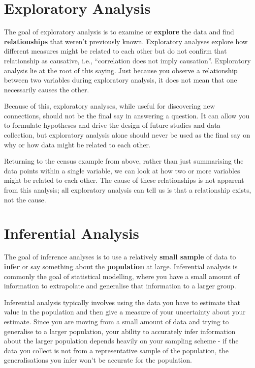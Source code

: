 \documentclass[10pt,a4paper,twoside]{article}\usepackage[]{graphicx}\usepackage[]{xcolor}
\begin{document}
\section{Exploratory Analysis}

The goal of exploratory analysis is to examine or \textbf{explore} the data and find \textbf{relationships} that weren't previously known. Exploratory analyses explore how different measures might be related to each other but do not confirm that relationship as causative, i.e., ``correlation does not imply causation''. Exploratory analysis lie at the root of this saying. Just because you observe a relationship between two variables during exploratory analysis, it does not mean that one necessarily causes the other.

Because of this, exploratory analyses, while useful for discovering new connections, should not be the final say in answering a question. It can allow you to formulate hypotheses and drive the design of future studies and data collection, but exploratory analysis alone should never be used as the final say on why or how data might be related to each other.

Returning to the census example from above, rather than just summarising the data points within a single variable, we can look at how two or more variables might be related to each other. The cause of these relationships is not apparent from this analysis; all exploratory analysis can tell us is that a relationship exists, not the cause.

\section{Inferential Analysis}

The goal of inference analyses is to use a relatively \textbf{small sample} of data to \textbf{infer} or say something about the \textbf{population} at large. Inferential analysis is commonly the goal of statistical modelling, where you have a small amount of information to extrapolate and generalise that information to a larger group.

Inferential analysis typically involves using the data you have to estimate that value in the population and then give a measure of your uncertainty about your estimate. Since you are moving from a small amount of data and trying to generalise to a larger population, your ability to accurately infer information about the larger population depends heavily on your sampling scheme - if the data you collect is not from a representative sample of the population, the generalisations you infer won't be accurate for the population.
\end{document}
